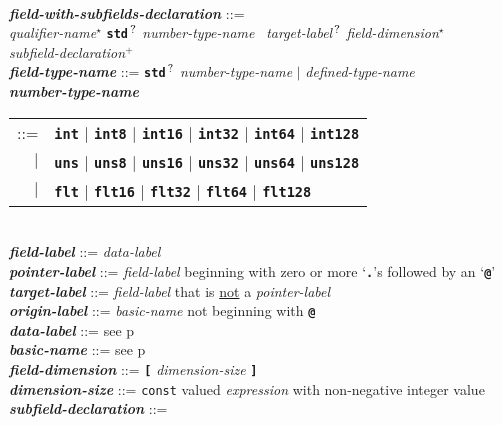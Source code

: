 \documentclass[12pt]{article}
\newcommand{\TT}[1]{{\tt \bfseries #1}}
\newcommand{\STAR}{{\Large $^\star$}}
\newcommand{\PLUS}[1][]{{$^{+#1}$}}
\newcommand{\QMARK}{{$^{\,\mbox{\footnotesize ?}}$}}
\newcommand{\ttkey}[1]{{\tt \bfseries #1}}
\newcommand{\emkey}[1]{{\em \bfseries #1}}
\newcommand{\pagref}[1]{p\pageref{#1}}
\newenvironment{indpar}[1][0.3in]%
	{\begin{list}{}%
		     {\setlength{\itemsep}{0in}%
		      \setlength{\topsep}{0in}%
		      \setlength{\parsep}{1ex}%
		      \setlength{\labelwidth}{#1}%
		      \setlength{\leftmargin}{#1}%
		      \addtolength{\leftmargin}{\labelsep}}%
	 \item}%
	{\end{list}}
\begin{document}
\begin{indpar}
\begin{tabular}{rl}
	\end{tabular}
\\[2ex]
\emkey{field-with-subfields-declaration} ::= \\
\hspace*{0.5in}
    {\em qualifier-name}\STAR{}
    \TT{std}\QMARK{} {\em number-type-name}~ {\em target-label}\QMARK{}
                {\em field-dimension}\STAR{} \\
\hspace*{0.5in}
    {\em subfield-declaration}\PLUS{}
\\[2ex]
\emkey{field-type-name} ::= \TT{std}\QMARK{} {\em number-type-name}
                        $|$ {\em defined-type-name} \\
\emkey{number-type-name}
    \begin{tabular}[t]{@{}rl}
    ::= &  \ttkey{int} $|$ \ttkey{int8} $|$ \ttkey{int16} $|$ \ttkey{int32}
                       $|$ \ttkey{int64} $|$ \ttkey{int128} \\
    $|$ &  \ttkey{uns} $|$ \ttkey{uns8} $|$ \ttkey{uns16} $|$ \ttkey{uns32}
                       $|$ \ttkey{uns64} $|$ \ttkey{uns128} \\
    $|$ &  \ttkey{flt} $|$ \ttkey{flt16} $|$ \ttkey{flt32} $|$ \ttkey{flt64}
                         $|$ \ttkey{flt128} \\
    \end{tabular}
\\[2ex]
\emkey{field-label}\label{FIELD-LABEL} ::=  {\em data-label} \\
\emkey{pointer-label}\label{POINTER-LABEL} ::=
    {\em field-label} beginning with zero or more `\TT{.}'s followed by
    an `\TT{@}' \\
\emkey{target-label}\label{TARGET-LABEL} ::=
    {\em field-label} that is \underline{not} a {\em pointer-label} \\
\emkey{origin-label}\label{ORIGIN-LABEL} ::=
    {\em basic-name} not beginning with \TT{@} \\
\emkey{data-label} ::=  see \pagref{DATA-LABEL} \\
\emkey{basic-name} ::=  see \pagref{BASIC-NAME}
\\[2ex]
\emkey{field-dimension} ::=  \TT{[} {\em dimension-size} \TT{]} \\
\emkey{dimension-size} ::=  {\tt const} valued {\em expression}
			    with non-negative integer value
\\[2ex]
\emkey{subfield-declaration} ::= \\
\hspace*{0.5in}

\end{indpar}
\end{document}
